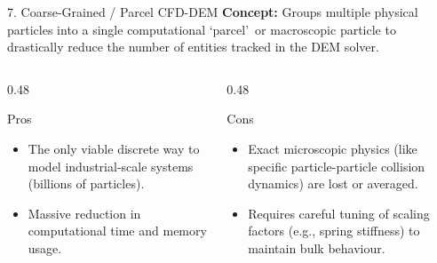 \begin{frame}{7. Coarse-Grained / Parcel CFD-DEM}
    \textbf{Concept:} Groups multiple physical particles into a single computational \lq parcel\rq\ or macroscopic particle to drastically reduce the number of entities tracked in the DEM solver.
    \vspace{0.3cm}
    
    \begin{columns}[T]
        \begin{column}{0.48\textwidth}
            \begin{block}{Pros}
                \begin{itemize}
                    \item The only viable discrete way to model industrial-scale systems (billions of particles).
                    \item Massive reduction in computational time and memory usage.
                \end{itemize}
            \end{block}
        \end{column}
        
        \begin{column}{0.48\textwidth}
            \begin{alertblock}{Cons}
                \begin{itemize}
                    \item Exact microscopic physics (like specific particle-particle collision dynamics) are lost or averaged.
                    \item Requires careful tuning of scaling factors (e.g., spring stiffness) to maintain bulk behaviour.
                \end{itemize}
            \end{alertblock}
        \end{column}
    \end{columns}
\end{frame}

